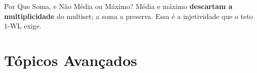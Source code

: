 \documentclass[aspectratio=169,xcolor=dvipsnames]{beamer}
\begin{document}
\begin{frame}{Por Que Soma, e Não Média ou Máximo?}
    \vspace{0.7em}
    Média e máximo \textbf{descartam a multiplicidade} do multiset; a soma a
    preserva. Essa é a injetividade que o teto 1-WL exige.
  \end{frame}

  \section{Tópicos Avançados}
\end{document}
